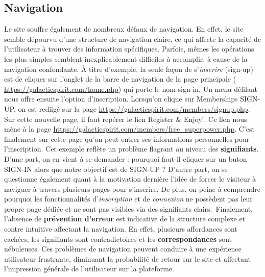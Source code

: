 \documentclass[9pt]{report}
\newcommand{\mathpazott}{\fontfamily{pplj}\selectfont}
\renewcommand{\texttt}[1]{{\scriptsize\mathpazott #1}}
\begin{document}
\begin{multicols*}{2}
  \subsection{Navigation}
  Le site souffre également de nombreux défaux de navigation. En effet, le site 
  semble dépourvu d'une structure de navigation claire, ce qui affecte la 
  capacité de l'utilisateur à trouver des information spécifiques. Parfois, 
  mêmes les opérations les plus simples semblent inexplicablement difficiles 
  à accomplir, à cause de la navigation confondante. À titre d'exemple, 
  la seule façon de s'\textit{inscrire}   (\texttt{sign-up}) est de cliquer 
  sur l'onglet de la barre de navigation de la page principale 
  (  \href{https://galacticspirit.com/home.php}{\texttt{https://galacticspirit.com/home.php}})
  qui porte le nom \texttt{sign-in}.  
  Un menu défilant nous offre ensuite l'option d'inscription. Lorsqu'on 
  clique sur \texttt{Memberships SIGN-UP}, on est rediigé sur la page 
  \href{https://galacticspirit.com/members/signup.php}{\texttt{https://galacticspirit.com/members/signup.php}}. Sur cette nouvelle page, il faut repérer le lien 
  \texttt{Register \& Enjoy!}. Ce lien nous mène à la page 
  \href{https://galacticspirit.com/members/free_superpower.php}{\texttt{https://galacticspirit.com/members/free\_superpower.php}}. C'est finalement sur cette page 
  qu'on peut entrer ses informations personnelles pour l'inscription. Cet exemple 
  reflète un problème flagrant au niveau des \textbf{signifiants}. D'une part, on en 
  vient à se demander : pourquoi faut-il cliquer sur un  buton 
  \texttt{SIGN-IN} alors que notre objectif est de \texttt{SIGN-UP} ? 
  D'autre part, on se questionne également quant 
  à la motivation dernière l'idée de forcer le visiteur à naviguer à travers plusieurs 
  pages pour s'inscrire. De plus, on peine à comprendre pourquoi 
  les fonctionnalités d'\textit{inscription} et de \textit{connexion} 
  ne possèdent pas 
  leur propre page dédiée et ne sont pas visibles via des signifiants clairs.\  Finalement, 
  l'absence de \textbf{prévention d'erreur} est indicative de la structure 
  complexe et contre intuitive affectant la navigation. En effet, plusieurs 
  affordances sont cachées, les signifiants sont contradictoires et les 
  \textbf{correspondances} sont nébuleuses. 
  Ces problèmes de navigation peuvent conduire à une expérience utilisateur frustrante, 
  diminuant la probabilité de retour sur le site et affectant l'impression générale de 
  l'utilisateur sur la plateforme.



\end{multicols*}
\end{document}
